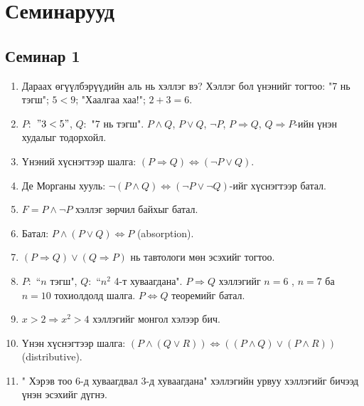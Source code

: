 \chapter{Семинарууд}
\section{Семинар 1}
\begin{enumerate}
  \item Дараах өгүүлбэрүүдийн аль нь хэллэг вэ? Хэллэг бол үнэнийг тогтоо: "7 нь тэгш"; $5<9$; "Хаалгаа хаа!"; $2+3=6$.
  \item $P:$ $"3<5"$, $Q:$ "7 нь тэгш". $P\land Q$, $P\lor Q$, $\lnot P$, $P\Rightarrow Q$, $Q\Rightarrow P$-ийн үнэн худалыг тодорхойл.
  \item Үнэний хүснэгтээр шалга: $(P\Rightarrow Q)\Leftrightarrow(\lnot P\lor Q)$.
  \item Де Морганы хууль: $\lnot(P\land Q)\Leftrightarrow(\lnot P\lor\lnot Q)$-ийг хүснэгтээр батал.
  \item $F= P\land\lnot P$ хэллэг зөрчил байхыг батал.

  \item Батал: $P\land(P\lor Q)\Leftrightarrow P$ (absorption).
  \item $(P\Rightarrow Q)\lor(Q\Rightarrow P)$ нь тавтологи мөн эсэхийг тогтоо.
  \item $P:$ ``$n$ тэгш", $Q:$ ``$n^2$ 4-т хуваагдана". $P\Rightarrow Q$ хэллэгийг $n=6$ , $n=7$ ба $n=10$ тохиолдолд шалга. $P\Leftrightarrow Q$ теоремийг батал.
  \item $x>2 \Rightarrow x^2>4$ хэллэгийг монгол хэлээр бич.
  \item Үнэн хүснэгтээр шалга: $(P\land(Q\lor R))\Leftrightarrow((P\land Q)\lor(P\land R))$ (distributive).
  \item " Хэрэв тоо 6-д хуваагдвал 3-д хуваагдана" хэллэгийн урвуу хэллэгийг бичээд үнэн эсэхийг дүгнэ.
  
\end{enumerate}
\newpage

